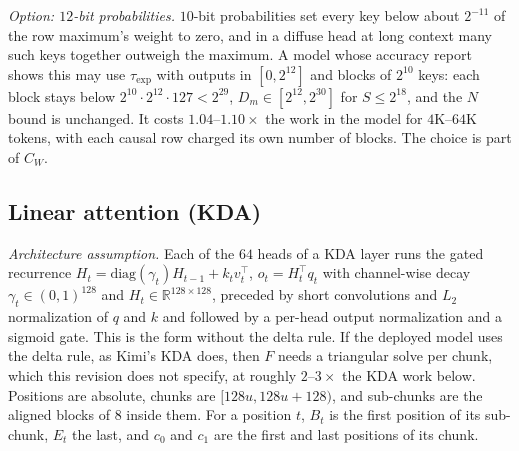\documentclass[11pt]{article}
\begin{document}
\emph{Option: \(12\)-bit probabilities.}
\(10\)-bit probabilities set every key below about \(2^{-11}\) of the row maximum's weight to zero, and in a diffuse head at long context many such keys together outweigh the maximum.
A model whose accuracy report shows this may use \(\tau_{\exp}\) with outputs in \([0, 2^{12}]\) and blocks of \(2^{10}\) keys: each block stays below \(2^{10}\cdot 2^{12}\cdot 127 < 2^{29}\), \(D_m \in [2^{12}, 2^{30}]\) for \(S \le 2^{18}\), and the \(N\) bound is unchanged.
It costs \(1.04\)--\(1.10\times\) the work in the model for \(4\)K--\(64\)K tokens, with each causal row charged its own number of blocks.
The choice is part of \(C_W\).

\subsection{Linear attention (KDA)}
\label{sec:kda}

\emph{Architecture assumption.} Each of the \(64\) heads of a KDA layer runs the gated recurrence \(H_t = \mathrm{diag}(\gamma_t) H_{t-1} + k_t v_t^{\top}\), \(o_t = H_t^{\top} q_t\) with channel-wise decay \(\gamma_t \in (0,1)^{128}\) and \(H_t \in \mathbb{R}^{128\times128}\), preceded by short convolutions and \(L_2\) normalization of \(q\) and \(k\) and followed by a per-head output normalization and a sigmoid gate.
This is the form without the delta rule.
If the deployed model uses the delta rule, as Kimi's KDA does, then \(F\) needs a triangular solve per chunk, which this revision does not specify, at roughly \(2\)--\(3\times\) the KDA work below.
Positions are absolute, chunks are \([128u, 128u + 128)\), and sub-chunks are the aligned blocks of \(8\) inside them.
For a position \(t\), \(B_t\) is the first position of its sub-chunk, \(E_t\) the last, and \(c_0\) and \(c_1\) are the first and last positions of its chunk.
\end{document}
